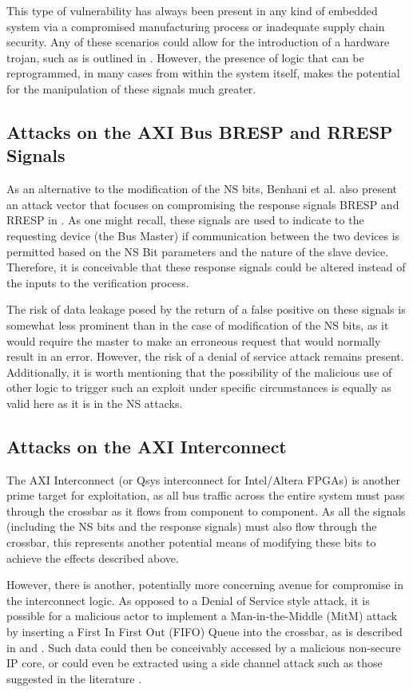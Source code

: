 \documentclass[journal]{IEEEtran}
\begin{document}
This type of vulnerability has always been present in any kind of embedded system via a
compromised manufacturing process or inadequate supply chain security. Any of these
scenarios could allow for the introduction of a hardware trojan, such as is outlined in
\cite{bhunia_hardware_2014}. However, the presence of logic that can be reprogrammed, in
many cases from within the system itself, makes the potential for the manipulation of
these signals much greater.


\subsection{Attacks on the AXI Bus BRESP and RRESP Signals}
As an alternative to the modification of the NS bits, Benhani et al. also present an
attack vector that focuses on compromising the response signals BRESP and RRESP in 
\cite{benhani_security_2019}. As one might recall, these signals are used to indicate to
the requesting device (the Bus Master) if communication between the two devices is
permitted based on the NS Bit parameters and the nature of the slave device. Therefore, it
is conceivable that these response signals could be altered instead of the inputs to the
verification process. 

The risk of data leakage posed by the return of a false positive on these signals is
somewhat less prominent than in the case of modification of the NS bits, as it would
require the master to make an erroneous request that would normally result in an error. 
However, the risk of a denial of service attack remains present. Additionally, it is worth
mentioning that the possibility of the malicious use of other logic to trigger such an
exploit under specific circumstances is equally as valid here as it is in the NS attacks.

\subsection{Attacks on the AXI Interconnect}
The AXI Interconnect (or Qsys interconnect for Intel/Altera FPGAs) is another prime target
for exploitation, as all bus traffic across the entire system must pass through the
crossbar as it flows from component to component. As all the signals (including the NS
bits and the response signals) must also flow through the crossbar, this represents
another potential means of modifying these bits to achieve the effects described above.

However, there is another, potentially more concerning avenue for compromise in the
interconnect logic. As opposed to a Denial of Service style attack, it is possible for a
malicious actor to implement a Man-in-the-Middle (MitM) attack by inserting a First In
First Out (FIFO) Queue into the crossbar, as is described in \cite{benhani_security_2017}
and \cite{benhani_security_2019}. Such data could then be conceivably accessed by a
malicious non-secure IP core, or could even be extracted using a side channel attack such
as those suggested in the literature \cite{bukasa_how_2018}.
\end{document}
